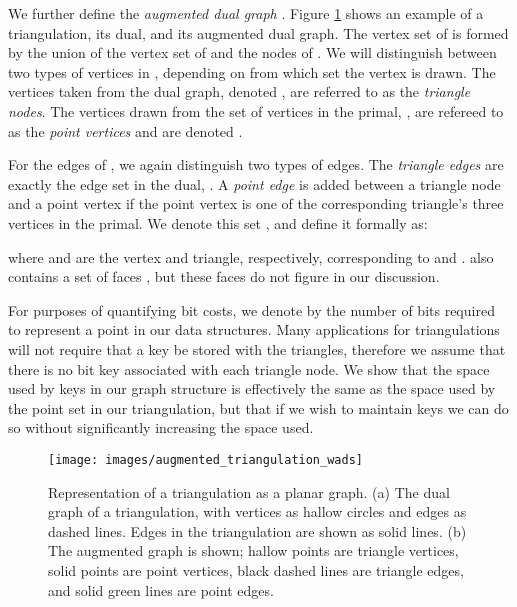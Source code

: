 We further define the \emph{augmented dual graph} 
 .
Figure \ref{fig:aug_tri} shows an example of a triangulation, its dual, 
and its augmented dual graph.
The vertex set of  is formed by the union of the vertex set 
 of  and the nodes  of . 
We will distinguish between two types of vertices in , 
depending on from which set the vertex is drawn. 
The vertices taken from the dual graph, denoted , 
are referred to as the \emph{triangle nodes}. 
The vertices drawn from the set of vertices in the primal, , 
are refereed   
to as the \emph{point vertices} and are denoted .

For the edges of , we again distinguish two types
 of edges. 
The \emph{triangle edges} are exactly the edge set in the dual, . 
A \emph{point edge} is added between a triangle node and a point vertex
 if the point vertex is one of the corresponding triangle's three vertices in 
 the primal.  
We denote this set , and define it formally as:\\

\begin{centering}

\end{centering}
\vspace{12pt}


\noindent where  and  are the vertex and triangle, respectively, corresponding to 
 and . 
 also contains a set of faces , but these faces 
do not figure in our discussion. 


For purposes of quantifying bit costs, we denote by  
the number of bits required to represent a point in our data structures. 
Many applications for triangulations will not require that a key be stored 
with the triangles, therefore we assume that there is no  bit key associated 
with each triangle node. 
We show that the space used by keys in our graph structure is effectively 
the same as the space used by the point set in our triangulation, but that 
if we wish to maintain keys we can do so without significantly increasing 
the space used.

\begin{figure}
\centering
	\texttt{[image: images/augmented\_triangulation\_wads]}
\caption[Representation of a triangulation as a planar graph]{Representation 
	of a triangulation as a planar graph. 
  (a) The dual graph  of a triangulation, with vertices as hallow 
circles and edges as dashed lines. 
Edges in the triangulation  are shown as solid lines. 
(b) The augmented graph  is shown;
hallow points are triangle vertices, solid points are point 
vertices, black dashed lines are triangle edges, and solid green lines are point 
edges. }\label{fig:aug_tri}
\end{figure}


